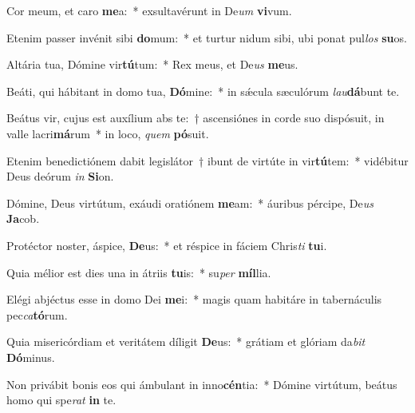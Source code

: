 \item Cor meum, et caro \textbf{me}a:~* exsultavérunt in De\textit{um} \textbf{vi}vum.
\item Etenim passer invénit sibi \textbf{do}mum:~* et turtur nidum sibi, ubi ponat pul\textit{los} \textbf{su}os.
\item Altária tua, Dómine vir\textbf{tú}tum:~* Rex meus, et De\textit{us} \textbf{me}us.
\item Beáti, qui hábitant in domo tua, \textbf{Dó}mine:~* in sǽcula sæculórum \textit{lau}\textbf{dá}bunt te.
\item Beátus vir, cujus est auxílium abs te:~† ascensiónes in corde suo dispósuit, in valle lacri\textbf{má}rum~* in loco, \textit{quem} \textbf{pó}suit.
\item Etenim benedictiónem dabit legislátor~† ibunt de virtúte in vir\textbf{tú}tem:~* vidébitur Deus deórum \textit{in} \textbf{Si}on.
\item Dómine, Deus virtútum, exáudi oratiónem \textbf{me}am:~* áuribus pércipe, De\textit{us} \textbf{Ja}cob.
\item Protéctor noster, áspice, \textbf{De}us:~* et réspice in fáciem Chris\textit{ti} \textbf{tu}i.
\item Quia mélior est dies una in átriis \textbf{tu}is:~* su\textit{per} \textbf{míl}lia.
\item Elégi abjéctus esse in domo Dei \textbf{me}i:~* magis quam habitáre in tabernáculis pec\textit{ca}\textbf{tó}rum.
\item Quia misericórdiam et veritátem díligit \textbf{De}us:~* grátiam et glóriam da\textit{bit} \textbf{Dó}minus.
\item Non privábit bonis eos qui ámbulant in inno\textbf{cén}tia:~* Dómine virtútum, beátus homo qui spe\textit{rat} \textbf{in} te.
